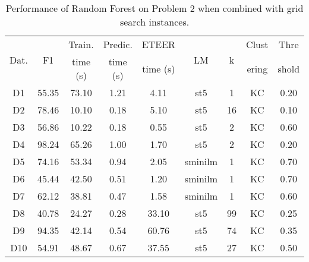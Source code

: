 \begin{table}[t]
\begin{center}  
\footnotesize 
\setlength{\tabcolsep}{4pt}
\caption{Performance of Random Forest on Problem 2 when combined with grid search instances.} 
\label{tab:lr-with-data-features}
\begin{tabular}{|c|c|c|c|c|c|c|c|c|}
\hline
\multirow{2}{*}{Dat.}  & \multirow{2}{*}{F1} & Train.  & Predic.  & ETEER  & \multirow{2}{*}{LM} & \multirow{2}{*}{k} & Clust & Thre \\
 & & time (s) & time (s) &  time (s) &  &  & ering & shold \\
\hline
\hline
D1 & 55.35 & 73.10 & 1.21 & 4.11 & st5 & 1 & KC & 0.20 \\
D2 & 78.46 & 10.10 & 0.18 & 5.10 & st5 & 16 & KC & 0.10 \\
D3 & 56.86 & 10.22 & 0.18 & 0.55 & st5 & 2 & KC & 0.60 \\
D4 & 98.24 & 65.26 & 1.00 & 1.70 & st5 & 2 & KC & 0.20 \\
D5 & 74.16 & 53.34 & 0.94 & 2.05 & sminilm & 1 & KC & 0.70 \\
D6 & 45.44 & 42.50 & 0.51 & 1.20 & sminilm & 1 & KC & 0.70 \\
D7 & 62.12 & 38.81 & 0.47 & 1.58 & sminilm & 1 & KC & 0.60 \\
D8 & 40.78 & 24.27 & 0.28 & 33.10 & st5 & 99 & KC & 0.25 \\
D9 & 94.35 & 42.14 & 0.54 & 60.76 & st5 & 74 & KC & 0.35 \\
D10 & 54.91 & 48.67 & 0.67 & 37.55 & st5 & 27 & KC & 0.50 \\
\hline
\end{tabular}
\end{center}  
\end{table}
